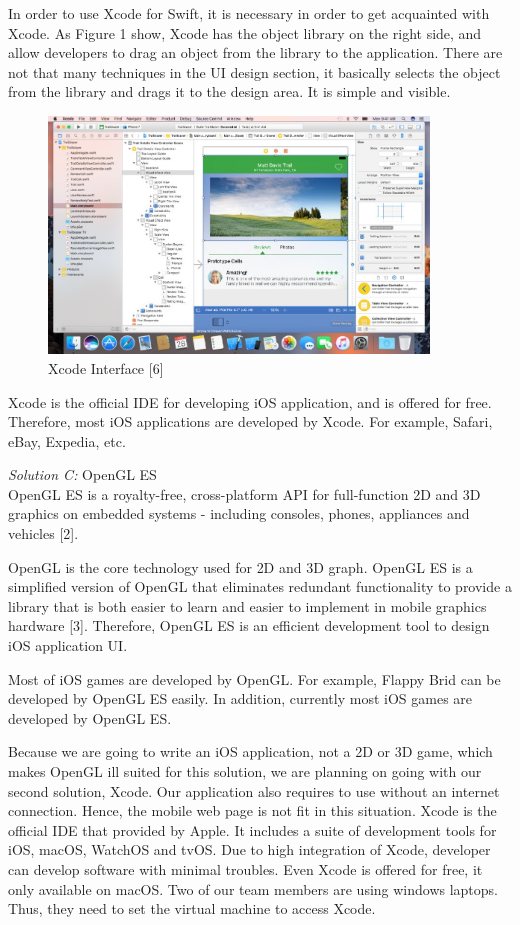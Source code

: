 \documentclass[letterpaper, 10pt,titlepage]{article}
\begin{document}
In order to use Xcode for Swift, it is necessary in order to get acquainted with Xcode. As Figure 1 show, Xcode has the object library on the right side, and allow developers to drag an object from the library to the application. There are not that many techniques in the UI design section, it basically selects the object from the library and drags it to the design area. It is simple and visible.

\begin{figure}[ht]
    \centering
    \includegraphics[width=0.9\textwidth]{j1}
    \caption{Xcode Interface [6]}
    \label{jiawei1}
\end{figure}

Xcode is the official IDE for developing iOS application, and is offered for free. Therefore, most iOS applications are developed by Xcode. For example, Safari, eBay, Expedia, etc.


\textit{Solution C:} OpenGL ES\\
OpenGL ES is a royalty-free, cross-platform API for full-function 2D and 3D graphics on embedded systems - including consoles, phones, appliances and vehicles [2]. 


OpenGL is the core technology used for 2D and 3D graph. OpenGL ES is a simplified version of OpenGL that eliminates redundant functionality to provide a library that is both easier to learn and easier to implement in mobile graphics hardware [3]. Therefore, OpenGL ES is an efficient development tool to design iOS application UI. 


Most of iOS games are developed by OpenGL. For example, Flappy Brid can be developed by OpenGL ES easily. In addition, currently most iOS games are developed by OpenGL ES.


Because we are going to write an iOS application, not a 2D or 3D game, which makes OpenGL ill suited for this solution, we are planning on going with our second solution, Xcode. Our application also requires to use without an internet connection. Hence, the mobile web page is not fit in this situation. Xcode is the official IDE that provided by Apple. It includes a suite of development tools for iOS, macOS, WatchOS and tvOS. Due to high integration of Xcode, developer can develop software with minimal troubles. Even Xcode is offered for free, it only available on macOS. Two of our team members are using windows laptops. Thus, they need to set the virtual machine to access Xcode.
\end{document}
